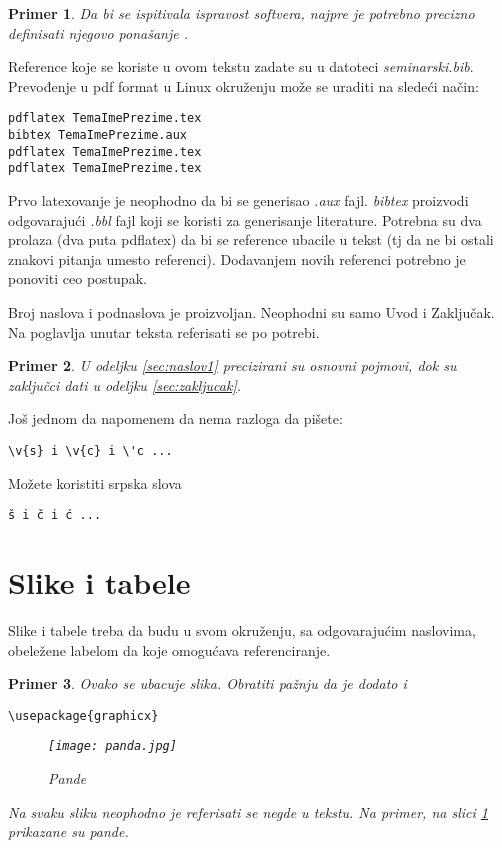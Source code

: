 \documentclass[a4paper]{article}
\newtheorem{primer}{Primer}[section]
\begin{document}
\begin{primer}
 Da bi se ispitivala ispravost softvera, najpre je potrebno precizno definisati njegovo ponašanje \cite{laski2009software}. 
\end{primer}

Reference koje se koriste u ovom tekstu zadate su u datoteci {\em seminarski.bib}. Prevođenje u pdf format u Linux okruženju može se uraditi na sledeći način:
\begin{verbatim}
pdflatex TemaImePrezime.tex 
bibtex TemaImePrezime.aux 
pdflatex TemaImePrezime.tex 
pdflatex TemaImePrezime.tex 
\end{verbatim}
Prvo latexovanje je neophodno da bi se generisao {\em .aux} fajl. {\em bibtex} proizvodi odgovarajući {\em .bbl} fajl koji se koristi za generisanje literature. 
Potrebna su dva prolaza (dva puta pdflatex) da bi se reference ubacile u tekst (tj da ne bi ostali znakovi pitanja umesto referenci). Dodavanjem novih referenci potrebno je ponoviti ceo postupak.  











Broj naslova i podnaslova je proizvoljan. Neophodni su samo Uvod i Zaključak. Na poglavlja unutar teksta referisati se po potrebi. 
\begin{primer}
U odeljku \ref{sec:naslov1} precizirani su osnovni pojmovi, dok su zaključci dati u odeljku \ref{sec:zakljucak}.
\end{primer}

Još jednom da napomenem da nema razloga da pišete:
\begin{verbatim}
\v{s} i \v{c} i \'c ...
\end{verbatim}
Možete koristiti srpska slova
\begin{verbatim}
š i č i ć ... 
\end{verbatim}



\section{Slike i tabele}
\label{slike_i_tabele}

Slike i tabele treba da budu u svom okruženju, sa odgovarajućim naslovima, obeležene labelom da koje omogućava referenciranje. 

\begin{primer} Ovako se ubacuje slika. Obratiti pažnju da je dodato i 
\begin{verbatim}
\usepackage{graphicx}
\end{verbatim}

\begin{figure}[h!]
\begin{center}
\texttt{[image: panda.jpg]}
\end{center}
\caption{Pande}
\label{fig:pande}
\end{figure}

Na svaku sliku neophodno je referisati se negde u tekstu. Na primer, na slici \ref{fig:pande} prikazane su pande. 
\end{primer}
\end{document}
